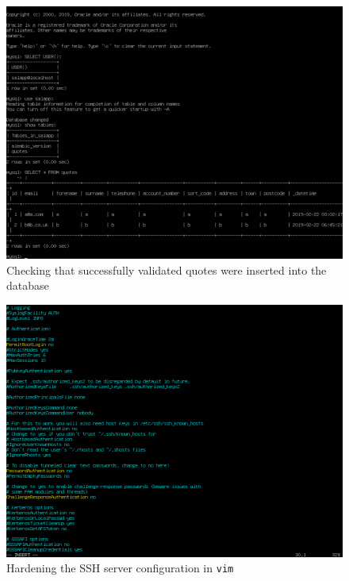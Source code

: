 \pagebreak
\begin{figure}[h!]
\centering
\captionsetup{skip=\skipfigurecaptionlen}
\includegraphics[width=1\textwidth]{screenshots/IY2D502-2019-02-22-06-50-24.png}
\caption{Checking that successfully validated quotes were inserted into the database}
\label{fig:IY2D502-2019-02-22-06-50-24}
\end{figure}

\pagebreak
\begin{figure}[h!]
\centering
\captionsetup{skip=\skipfigurecaptionlen}
\includegraphics[width=1\textwidth]{screenshots/IY2D502-2019-02-26-17-44-30.png}
\caption{Hardening the SSH server configuration in \texttt{vim}}
\label{fig:IY2D502-2019-02-26-17-44-30}
\end{figure}

